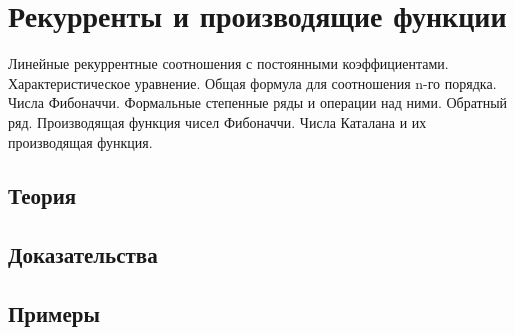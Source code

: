 
\section{Рекурренты и производящие функции}
\label{sec:2.2.06-recurrences-generating}

\begin{ticket}
Линейные рекуррентные соотношения с постоянными коэффициентами. Характеристическое уравнение. Общая формула для соотношения n-го порядка. Числа Фибоначчи. Формальные степенные ряды и операции над ними. Обратный ряд. Производящая функция чисел Фибоначчи. Числа Каталана и их производящая функция.
\end{ticket}

\subsection*{Теория}

\subsection*{Доказательства}

\subsection*{Примеры}
